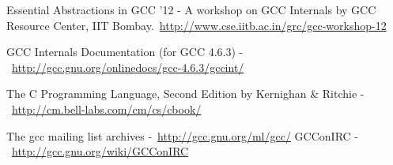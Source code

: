 \begin{thebibliography}{99}
Essential Abstractions in GCC '12 - A workshop on GCC Internals by GCC Resource Center, IIT Bombay.\ \url{http://www.cse.iitb.ac.in/grc/gcc-workshop-12}

GCC Internals Documentation (for GCC 4.6.3) -\ \url{http://gcc.gnu.org/onlinedocs/gcc-4.6.3/gccint/}

The C Programming Language, Second Edition by Kernighan \& Ritchie -\ \url{http://cm.bell-labs.com/cm/cs/cbook/}

The gcc mailing list archives -\ \url{http://gcc.gnu.org/ml/gcc/}
GCConIRC -\ \url{http://gcc.gnu.org/wiki/GCConIRC}

\end{thebibliography}
